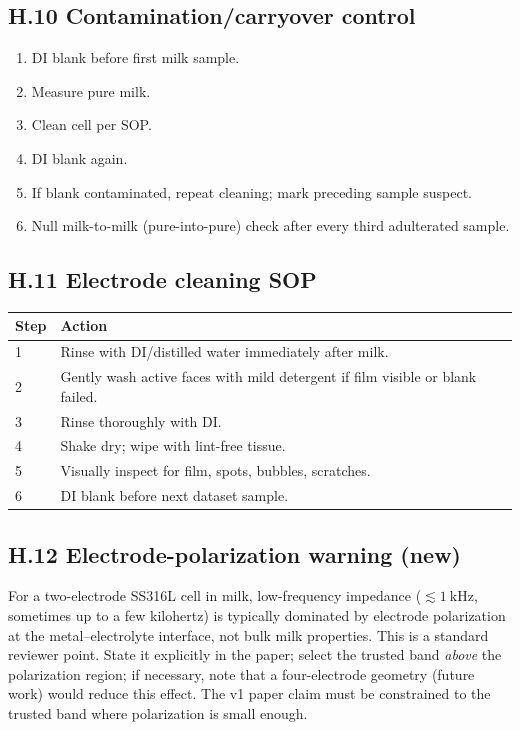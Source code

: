 \documentclass[11pt,a4paper]{article}
\begin{document}
\subsection{H.10 Contamination/carryover control}

\begin{enumerate}
\item DI blank before first milk sample.
\item Measure pure milk.
\item Clean cell per SOP.
\item DI blank again.
\item If blank contaminated, repeat cleaning; mark preceding sample suspect.
\item Null milk-to-milk (pure-into-pure) check after every third adulterated sample.
\end{enumerate}

\subsection{H.11 Electrode cleaning SOP}

\begin{xltabular}{\textwidth}{L{25mm}Y}
\toprule
\textbf{Step} & \textbf{Action}\\
 & Rinse with DI/distilled water immediately after milk.\\
2 & Gently wash active faces with mild detergent if film visible or blank failed.\\
3 & Rinse thoroughly with DI.\\
4 & Shake dry; wipe with lint-free tissue.\\
5 & Visually inspect for film, spots, bubbles, scratches.\\
6 & DI blank before next dataset sample.\\
\bottomrule
\end{xltabular}

\subsection{H.12 Electrode-polarization warning (new)}

\begin{reviewerbox}
For a two-electrode SS316L cell in milk, low-frequency impedance ($\lesssim \SI{1}{\kilo\hertz}$, sometimes up to a few kilohertz) is typically dominated by electrode polarization at the metal--electrolyte interface, not bulk milk properties. This is a standard reviewer point. State it explicitly in the paper; select the trusted band \emph{above} the polarization region; if necessary, note that a four-electrode geometry (future work) would reduce this effect. The v1 paper claim must be constrained to the trusted band where polarization is small enough.
\end{reviewerbox}
\end{document}

